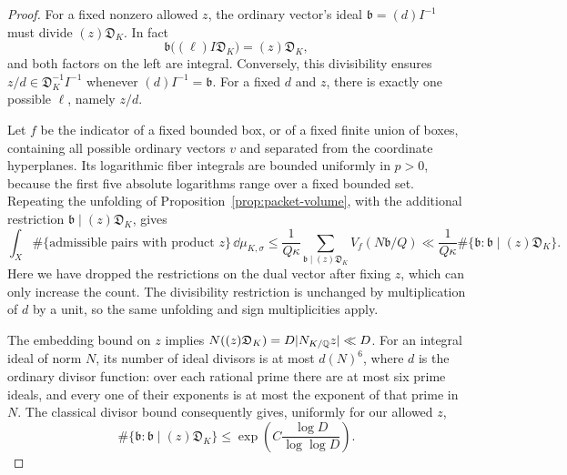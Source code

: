 \begin{proof}
For a fixed nonzero allowed $z$, the ordinary vector's ideal
$\mathfrak b=(d)I^{-1}$ must divide $(z)\mathfrak D_K$.  In fact
\[
 \mathfrak b\bigl((\ell)I\mathfrak D_K\bigr)
       =(z)\mathfrak D_K,
\]
and both factors on the left are integral.  Conversely, this
divisibility ensures $z/d\in\mathfrak D_K^{-1}I^{-1}$ whenever
$(d)I^{-1}=\mathfrak b$.  For a fixed $d$ and $z$, there is exactly
one possible $\ell$, namely $z/d$.

Let $f$ be the indicator of a fixed bounded box, or of a fixed finite
union of boxes, containing all possible ordinary vectors $v$ and
separated from the coordinate hyperplanes.  Its logarithmic fiber
integrals are bounded uniformly in $p>0$, because the first five
absolute logarithms range over a fixed bounded set.  Repeating
the unfolding of Proposition~\ref{prop:packet-volume}, with the
additional restriction $\mathfrak b\mid(z)\mathfrak D_K$, gives
\begin{equation}
 \int_X\#\{\text{admissible pairs with product }z\}
           \,\dd\mu_{K,\sigma}
 \le\frac1{Q\kappa}
       \sum_{\mathfrak b\mid(z)\mathfrak D_K}
          V_f(N\mathfrak b/Q)
 \ll\frac1{Q\kappa}
          \#\{\mathfrak b:\mathfrak b\mid(z)\mathfrak D_K\}.
                                                        \label{eq:pair-unfolding}
\end{equation}
Here we have dropped the restrictions on the dual vector after
fixing $z$, which can only increase the count.  The divisibility
restriction is unchanged by multiplication of $d$ by a unit, so
the same unfolding and sign multiplicities apply.

The embedding bound on $z$ implies
$N((z)\mathfrak D_K)=D|N_{K/\mathbb Q}z|\ll D$.
For an integral ideal of norm $N$, its number of ideal divisors is
at most $d(N)^6$, where $d$ is the ordinary divisor function: over
each rational prime there are at most six prime ideals, and every
one of their exponents is at most the exponent of that prime in
$N$.  The classical divisor bound consequently gives, uniformly
for our allowed $z$,
\begin{equation}
 \#\{\mathfrak b:\mathfrak b\mid(z)\mathfrak D_K\}
       \le\exp\left(C\frac{\log D}{\log\log D}\right).
                                                        \label{eq:ideal-divisors}
\end{equation}


\end{proof}

